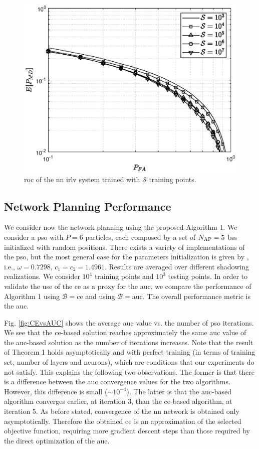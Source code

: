 \documentclass[conference,final]{IEEEtran}
\begin{document}
\begin{figure}[t]
    \centering
    \includegraphics[width=0.9\columnwidth]{res_avg_nTrain.eps}
    \caption{\ac{roc} of the \ac{nn} \ac{irlv} system trained with $\mathcal{S}$ training points.}
    \label{fig:n_train}
\end{figure}

\subsection{Network Planning Performance}

We consider now the network planning using the proposed Algorithm 1. We consider a \ac{pso} with $P=6$ particles, each composed by a set of $N_{\rm AP}=5$ \acp{bs} initialized with random positions. There exists a variety of implementations of the \ac{pso}, but the most general case for the parameters initialization is given by \cite{clerc2002}, i.e.,   $\omega=0.7298$, $c_1=c_2=1.4961$. Results are averaged over different shadowing realizations. We consider $10^4$ training  points and  $10^3$ testing points. In order to validate the use of the \ac{ce} as a proxy for the \ac{auc}, we compare the performance of Algorithm 1 using $\mathcal{B}=$\ac{ce} and using $\mathcal{B}=$\ac{auc}. The overall performance metric is the \ac{auc}.

Fig. \ref{fig:CEvsAUC} shows the average \ac{auc} value vs. the number of \ac{pso} iterations. We see that the \ac{ce}-based solution reaches approximately the same  \ac{auc} value of the \ac{auc}-based solution as the number of iterations increases. 
Note that the result of Theorem 1 holds asymptotically and with perfect training (in terms of training set, number of layers and neurons), which are conditions that our experiments do not satisfy. This explains the following two observations. The former is that there is a  difference between the \ac{auc} convergence values for the two algorithms. However, this difference is small ($\sim 10^{-4}$). The latter is that the \ac{auc}-based algorithm converges earlier, at iteration 3, than the \ac{ce}-based algorithm, at iteration 5. As before stated, convergence of the \ac{nn} network is obtained only asymptotically. Therefore the obtained \ac{ce} is an approximation of the selected objective function, requiring more gradient descent steps than those required by the direct optimization of the \ac{auc}.   
\end{document}
